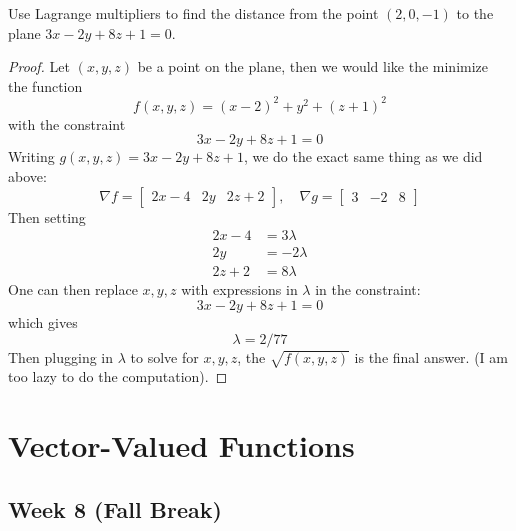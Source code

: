 \documentclass[openany]{book}
\begin{document}
\begin{prob}
Use Lagrange multipliers to find the distance from the point $(2, 0, -1)$ to the plane $3x - 2y + 8z + 1 = 0$.
\end{prob}
\begin{proof}
    Let $(x,y,z)$ be a point on the plane, then we would like the minimize the function 
    \begin{equation*}
        f(x,y,z)=(x-2)^2+y^2+(z+1)^2
    \end{equation*}
    with the constraint
    \begin{equation*}
        3x - 2y + 8z + 1 = 0
    \end{equation*}
    Writing $g(x,y,z)=3x - 2y + 8z + 1$, we do the exact same thing as we did above:
    \begin{equation*}
        \nabla f=\begin{bmatrix}
            2x-4&2y&2z+2
        \end{bmatrix}, \quad \nabla g=\begin{bmatrix}
            3&-2&8
        \end{bmatrix}
    \end{equation*}
    Then setting 
    \begin{align*}
        2x-4&=3\lambda\\
        2y&=-2\lambda\\
        2z+2&=8\lambda
    \end{align*}
    One can then replace $x,y,z$ with expressions in $\lambda$ in the constraint:
    \begin{equation*}
        3x-2y+8z+1=0
    \end{equation*}
    which gives 
    \begin{equation*}
        \lambda=2/77
    \end{equation*}
    Then plugging in $\lambda$ to solve for $x,y,z$, the $\sqrt{f(x,y,z)}$ is the final answer. (I am too lazy to do the computation).
\end{proof}

\chapter{Vector-Valued Functions}
\section*{\centering Week 8 (Fall Break)}

\end{document}
